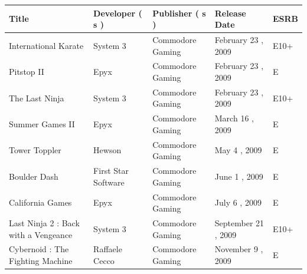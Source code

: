 \documentclass{article}
\begin{document}
\begin{tabular}{lllll}
\toprule
Title & Developer ( s ) & Publisher ( s ) & Release Date & ESRB \\
\midrule
International Karate & System 3 & Commodore Gaming & February 23 , 2009 & E10+ \\
Pitstop II & Epyx & Commodore Gaming & February 23 , 2009 & E \\
The Last Ninja & System 3 & Commodore Gaming & February 23 , 2009 & E10+ \\
Summer Games II & Epyx & Commodore Gaming & March 16 , 2009 & E \\
Tower Toppler & Hewson & Commodore Gaming & May 4 , 2009 & E \\
Boulder Dash & First Star Software & Commodore Gaming & June 1 , 2009 & E \\
California Games & Epyx & Commodore Gaming & July 6 , 2009 & E \\
Last Ninja 2 : Back with a Vengeance & System 3 & Commodore Gaming & September 21 , 2009 & E10+ \\
Cybernoid : The Fighting Machine & Raffaele Cecco & Commodore Gaming & November 9 , 2009 & E \\
\bottomrule
\end{tabular}
\end{document}
